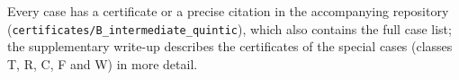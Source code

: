 Every case has a certificate or a precise citation in the accompanying repository
(\texttt{certificates/\allowbreak B\_intermediate\_quintic}), which also contains the full case list; the
supplementary write-up \cite{SuppB} describes the certificates of the special cases (classes T, R, C, F and W)
in more detail.
